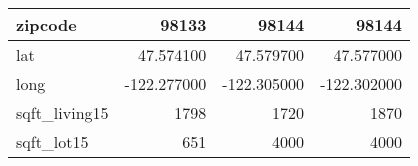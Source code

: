 \begin{table}[H]
\begin{tabular}{|l|r|r|r|}
\hline zipcode & \cellcolor[rgb]{0.9, 0.54, 0.52} 98133 & 98144 & 98144 \\
\hline lat & \cellcolor[rgb]{0.9, 0.54, 0.52} 47.574100 & 47.579700 & 47.577000 \\
\hline long & \cellcolor[rgb]{0.9, 0.54, 0.52} -122.277000 & \cellcolor[rgb]{0.9, 0.54, 0.52} -122.305000 & \cellcolor[rgb]{0.9, 0.54, 0.52} -122.302000 \\
\hline sqft\_living15 & \cellcolor[rgb]{0.9, 0.54, 0.52} 1798 & 1720 & 1870 \\
\hline sqft\_lot15 & \cellcolor[rgb]{0.9, 0.54, 0.52} 651 & 4000 & 4000 \\
\hline
\end{tabular}
\end{table}
